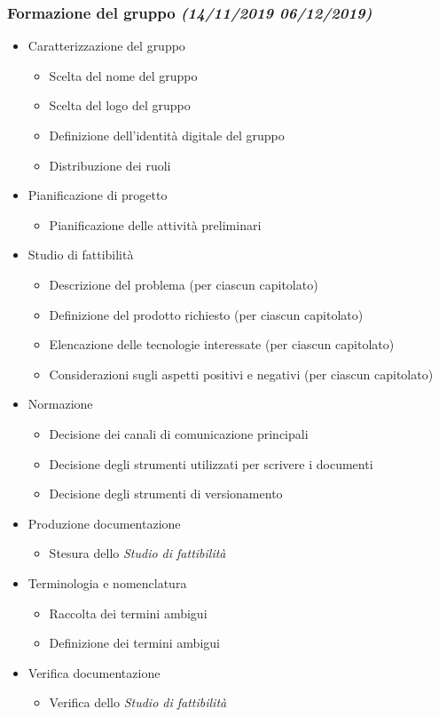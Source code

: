 \documentclass[../piano-di-progetto.tex]{subfiles}
\begin{document}
\subsubsection[Formazione del gruppo]{Formazione del gruppo {\normalsize\normalfont\itshape(14/11/2019  06/12/2019)}}%
\label{subs:formazione_del_gruppo}
\begin{itemize}
  \item Caratterizzazione del gruppo
  \begin{itemize}
    \item Scelta del nome del gruppo
    \item Scelta del logo del gruppo
    \item Definizione dell'identità digitale del gruppo
    \item Distribuzione dei ruoli
  \end{itemize}
  \item Pianificazione di progetto
  \begin{itemize}
    \item Pianificazione delle attività preliminari
  \end{itemize}
  \item Studio di fattibilità
  \begin{itemize}
    \item Descrizione del problema (per ciascun capitolato)
    \item Definizione del prodotto richiesto (per ciascun capitolato)
    \item Elencazione delle tecnologie interessate (per ciascun capitolato)
    \item Considerazioni sugli aspetti positivi e negativi (per ciascun capitolato)
  \end{itemize}
  \item Normazione
  \begin{itemize}
    \item Decisione dei canali di comunicazione principali
    \item Decisione degli strumenti utilizzati per scrivere i documenti
    \item Decisione degli strumenti di versionamento
  \end{itemize}
  \item Produzione documentazione
  \begin{itemize}
    \item Stesura dello \textit{Studio di fattibilità}
  \end{itemize}
  \item Terminologia e nomenclatura
  \begin{itemize}
    \item Raccolta dei termini ambigui
    \item Definizione dei termini ambigui
  \end{itemize}
  \item Verifica documentazione
  \begin{itemize}
    \item Verifica dello \textit{Studio di fattibilità}
  \end{itemize}
\end{itemize}
\end{document}
